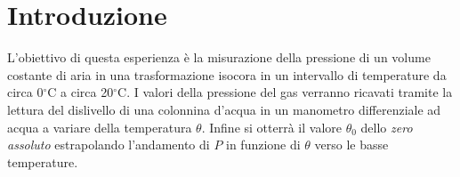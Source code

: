 \section{Introduzione}
L'obiettivo di questa esperienza è la misurazione della pressione di un volume costante di aria in una trasformazione isocora in un intervallo di temperature da circa 0$^\circ$C a circa 20$^\circ$C. I valori della pressione del gas verranno ricavati tramite la lettura del dislivello di una colonnina d'acqua in un manometro differenziale ad acqua a variare della temperatura $\theta$.
Infine si otterrà il valore $\theta_0$ dello \emph{zero assoluto} estrapolando l'andamento di $P$ in funzione di $\theta$ verso le basse temperature.
